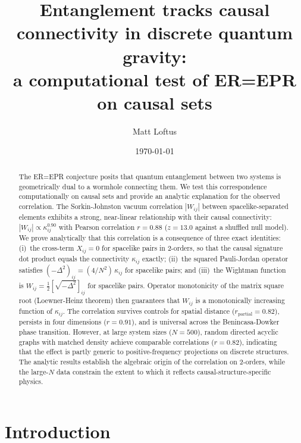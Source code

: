 \documentclass[aps,prd,twocolumn,superscriptaddress,nofootinbib]{revtex4-2}
\begin{document}
\title{Entanglement tracks causal connectivity in discrete quantum gravity:\\a computational test of ER=EPR on causal sets}

\author{Matt Loftus}

\date{\today}

\begin{abstract}
The ER=EPR conjecture posits that quantum entanglement between two systems is geometrically dual to a wormhole connecting them. We test this correspondence computationally on causal sets and provide an analytic explanation for the observed correlation. The Sorkin-Johnston vacuum correlation $|W_{ij}|$ between spacelike-separated elements exhibits a strong, near-linear relationship with their causal connectivity: $|W_{ij}| \propto \kappa_{ij}^{0.90}$ with Pearson correlation $r = 0.88$ ($z = 13.0$ against a shuffled null model). We prove analytically that this correlation is a consequence of three exact identities: (i)~the cross-term $X_{ij} = 0$ for spacelike pairs in 2-orders, so that the causal signature dot product equals the connectivity $\kappa_{ij}$ exactly; (ii)~the squared Pauli-Jordan operator satisfies $(-\Delta^2)_{ij} = (4/N^2)\,\kappa_{ij}$ for spacelike pairs; and (iii)~the Wightman function is $W_{ij} = \tfrac{1}{2}[\sqrt{-\Delta^2}]_{ij}$ for spacelike pairs. Operator monotonicity of the matrix square root (Loewner-Heinz theorem) then guarantees that $W_{ij}$ is a monotonically increasing function of $\kappa_{ij}$. The correlation survives controls for spatial distance ($r_{\text{partial}} = 0.82$), persists in four dimensions ($r = 0.91$), and is universal across the Benincasa-Dowker phase transition. However, at large system sizes ($N = 500$), random directed acyclic graphs with matched density achieve comparable correlations ($r = 0.82$), indicating that the effect is partly generic to positive-frequency projections on discrete structures. The analytic results establish the algebraic origin of the correlation on 2-orders, while the large-$N$ data constrain the extent to which it reflects causal-structure-specific physics.
\end{abstract}

\maketitle

\section{Introduction}
\end{document}

